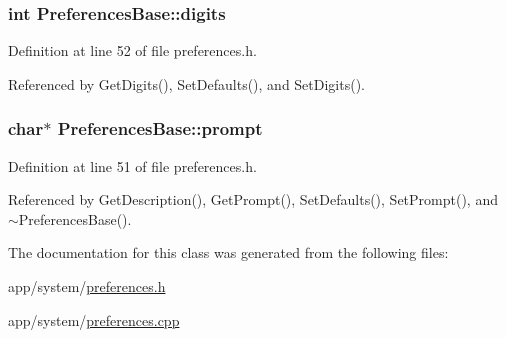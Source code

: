 \subsubsection[{\texorpdfstring{digits}{digits}}]{\setlength{\rightskip}{0pt plus 5cm}int Preferences\+Base\+::digits\hspace{0.3cm}{\ttfamily [private]}}\hypertarget{classPreferencesBase_add3d3cf98f920e03e425f11dabb6f984}{}\label{classPreferencesBase_add3d3cf98f920e03e425f11dabb6f984}


Definition at line 52 of file preferences.\+h.



Referenced by Get\+Digits(), Set\+Defaults(), and Set\+Digits().

\subsubsection[{\texorpdfstring{prompt}{prompt}}]{\setlength{\rightskip}{0pt plus 5cm}char$\ast$ Preferences\+Base\+::prompt\hspace{0.3cm}{\ttfamily [private]}}\hypertarget{classPreferencesBase_a88a6af58103e0498c366d61a628312e0}{}\label{classPreferencesBase_a88a6af58103e0498c366d61a628312e0}


Definition at line 51 of file preferences.\+h.



Referenced by Get\+Description(), Get\+Prompt(), Set\+Defaults(), Set\+Prompt(), and $\sim$\+Preferences\+Base().



The documentation for this class was generated from the following files\+:\begin{DoxyCompactItemize}
\item 
app/system/\hyperlink{preferences_8h}{preferences.\+h}\item 
app/system/\hyperlink{preferences_8cpp}{preferences.\+cpp}\end{DoxyCompactItemize}
